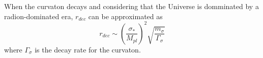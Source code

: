 \documentclass[amssymb,twocolumn,prd,nofootinbib,showpacs]{revtex4-1}
\begin{document}
When the curvaton decays and considering that the Universe is domminated by a radion-dominated era, $r_{dec}$ can be approximated as \cite{curvaton2,curvaton3}
\begin{equation}
r_{dec}\sim \left(\frac{\sigma_*}{M_{pl}}\right)^2\sqrt{\frac{m_\sigma}{\Gamma_{\sigma}}}
\end{equation}
where $\Gamma_\sigma$ is the decay rate for the curvaton.









\end{document}
